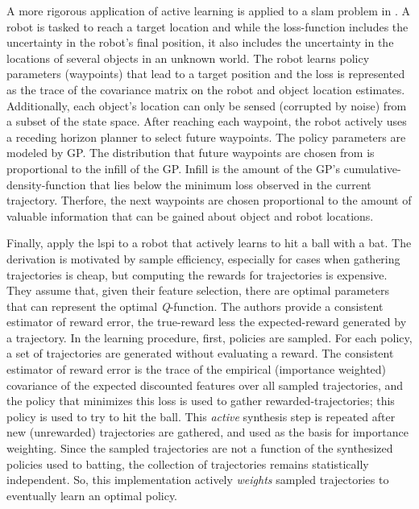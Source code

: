     A more rigorous application of active learning is applied to a \ac{slam} problem in \cite{martinez2007active}. A
    robot is tasked to reach a target location and while the loss-function includes the uncertainty in the robot's final
    position, it also includes the uncertainty in the locations of several objects in an unknown world. The robot learns
    policy parameters (waypoints) that lead to a target position and the loss is represented as the trace of the
    covariance matrix on the robot and object location estimates. Additionally, each object's location can only be
    sensed (corrupted by noise) from a subset of the state space. After reaching each waypoint, the robot actively uses
    a receding horizon planner to select future waypoints. The policy parameters are modeled by \acf{GP}. The
    distribution that future waypoints are chosen from is proportional to the infill of the \ac{GP}. Infill is the
    amount of the \ac{GP}'s cumulative-density-function that lies below the minimum loss observed in the current
    trajectory. Therfore, the next waypoints are chosen proportional to the amount of valuable information that can be
    gained about object and robot locations.

    Finally, \cite{akiyama2010efficient} apply the \ac{lspi} to a robot that actively learns to hit a ball with a bat.
    The derivation is motivated by sample efficiency, especially for cases when gathering trajectories is cheap, but
    computing the rewards for trajectories is expensive. They assume that, given their feature selection, there are
    optimal parameters that can represent the optimal \emph{Q}-function. The authors provide a consistent estimator of
    reward error, the true-reward less the expected-reward generated by a trajectory. In the learning procedure, first,
    policies are sampled. For each policy, a set of trajectories are generated without evaluating a reward. The
    consistent estimator of reward error is the trace of the empirical (importance weighted) covariance of the expected
    discounted features over all sampled trajectories, and the policy that minimizes this loss is used to gather
    rewarded-trajectories; this policy is used to try to hit the ball. This \emph{active} synthesis step is repeated
    after new (unrewarded) trajectories are gathered, and used as the basis for importance weighting. Since the sampled
    trajectories are not a function of the synthesized policies used to batting, the collection of trajectories remains
    statistically independent. So, this implementation actively \emph{weights} sampled trajectories to eventually learn
    an optimal policy.

